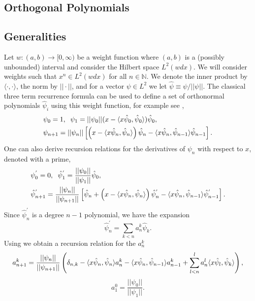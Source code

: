 \begin{subappendices}
\section{Orthogonal Polynomials}\label{orthopoly_app}
\subsection{Generalities}\label{ortho-general}
Let $w:(a,b)\rightarrow [0,\infty)$ be a weight function where $(a,b)$ is a (possibly unbounded) interval and consider the Hilbert space $L^2(w dx)$.   We will consider weights such that $x^n\in L^2(wdx)$ for all $n\in\mathbb{N}$. We denote the inner product by $\langle\cdot,\cdot\rangle$, the norm by $||\cdot||$, and for a vector $\psi\in L^2$ we let $\hat{\psi}\equiv \psi/||\psi||$.  The classical three term recurrence formula can be used to define a set of orthonormal polynomials $\hat{\psi}_i$ using this weight function, for example see \cite{Olver},
\begin{align}\label{poly_recursion}
&\psi_0=1, \hspace{2mm} \psi_1=||\psi_0||(x-\langle x\hat\psi_0,\hat{\psi}_0\rangle)\hat{\psi}_0,\\
&\psi_{n+1}=||\psi_n||\left[\left(x-\langle x\hat\psi_n,\hat\psi_n\rangle\right)\hat\psi_n-\langle x\hat\psi_n,\hat\psi_{n-1}\rangle\hat\psi_{n-1}\right].
\end{align}
One can also derive recursion relations for the derivatives of $\psi_n$ with respect to $x$, denoted with a prime,
\begin{align}\label{deriv_rec}
&\psi_0^{'}=0, \hspace{2mm} \hat{\psi}_1^{'}=\frac{||\psi_0||}{||\psi_1||}\hat\psi_0,\\
&\hat{\psi}_{n+1}^{'}=\frac{||\psi_n||}{||\psi_{n+1}||}\left[\hat\psi_n+\left(x-\langle x\hat\psi_n,\hat\psi_n\rangle\right)\hat{\psi}_n^{'}-\langle x\hat\psi_n,\hat\psi_{n-1}\rangle\hat{\psi}_{n-1}^{'}\right].
\end{align}
Since $\hat{\psi}_n^{'}$ is a degree $n-1$ polynomial, we have the expansion 
\begin{equation}
\hat{\psi}_n^{'}=\sum_{k<n} a_n^k \hat{\psi}_k.
\end{equation}
Using  we obtain a recursion relation for the $a_n^k$
\begin{equation}
a_{n+1}^k=\frac{||\psi_n||}{||\psi_{n+1}||}\left(\delta_{n,k}-\langle x\hat\psi_n,\hat\psi_{n}\rangle a_n^k-\langle x\hat\psi_n,\hat\psi_{n-1}\rangle a_{n-1}^k+\sum_{l<n}^la_n^l\langle x\hat\psi_l,\hat\psi_k\rangle\right),\notag
\end{equation}
\begin{equation}
a_1^0=\frac{||\psi_0||}{||\psi_1||}.
\end{equation}


\end{subappendices}

